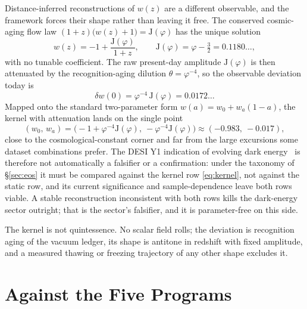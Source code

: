 \documentclass[11pt,letterpaper]{article}
\theoremstyle{definition}
\newcommand{\J}{\mathrm{J}}
\newcommand{\phiG}{\varphi}
\begin{document}
Distance-inferred reconstructions of $w(z)$ are a different
observable, and the framework forces their shape rather than leaving
it free.  The conserved cosmic-aging flow law
$(1+z)\bigl(w(z)+1\bigr)=\J(\phiG)$ has the unique solution
\begin{equation}\label{eq:kernel}
w(z)=-1+\frac{\J(\phiG)}{1+z},
\qquad
\J(\phiG)=\phiG-\tfrac32=0.1180\ldots,
\end{equation}
with no tunable coefficient.  The raw present-day amplitude
$\J(\phiG)$ is then attenuated by the recognition-aging dilution
$\theta=\phiG^{-4}$, so the observable deviation today is
\begin{equation}\label{eq:deltaw}
\delta w(0)=\phiG^{-4}\,\J(\phiG)=0.0172\ldots
\end{equation}
Mapped onto the standard two-parameter form
$w(a)=w_0+w_a(1-a)$, the kernel with attenuation lands on the single
point
\begin{equation}
(w_0,\,w_a)=\bigl(-1+\phiG^{-4}\J(\phiG),\ -\phiG^{-4}\J(\phiG)\bigr)
\approx(-0.983,\ -0.017),
\end{equation}
close to the cosmological-constant corner and far from the large
excursions some dataset combinations prefer.  The DESI Y1 indication
of evolving dark energy~\cite{DESI2024} is therefore not automatically
a falsifier or a confirmation: under the taxonomy of \S\ref{sec:eos}
it must be compared against the kernel row \eqref{eq:kernel}, not
against the static row, and its current significance and
sample-dependence leave both rows viable.  A stable reconstruction
inconsistent with both rows kills the dark-energy sector outright;
that is the sector's falsifier, and it is parameter-free on this side.

The kernel is not quintessence.  No scalar field rolls; the deviation
is recognition aging of the vacuum ledger, its shape is antitone in
redshift with fixed amplitude, and a measured thawing or freezing
trajectory of any other shape excludes it.

\section{Against the Five Programs}
\label{sec:comparison}
\end{document}
